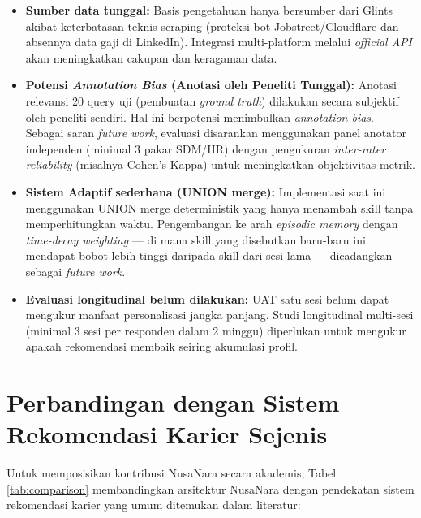 \begin{itemize}
  \item \textbf{Sumber data tunggal:} Basis pengetahuan hanya bersumber dari Glints
    akibat keterbatasan teknis scraping (proteksi bot Jobstreet/Cloudflare dan
    absennya data gaji di LinkedIn). Integrasi multi-platform melalui
    \textit{official API} akan meningkatkan cakupan dan keragaman data.
  \item \textbf{Potensi \textit{Annotation Bias} (Anotasi oleh Peneliti Tunggal):}
    Anotasi relevansi 20 query uji (pembuatan \textit{ground truth}) dilakukan secara
    subjektif oleh peneliti sendiri. Hal ini berpotensi menimbulkan \textit{annotation bias}.
    Sebagai saran \textit{future work}, evaluasi disarankan menggunakan panel anotator
    independen (minimal 3 pakar SDM/HR) dengan pengukuran \textit{inter-rater
    reliability} (misalnya Cohen's Kappa) untuk meningkatkan objektivitas metrik.
  \item \textbf{Sistem Adaptif sederhana (UNION merge):} Implementasi saat ini
    menggunakan UNION merge deterministik yang hanya menambah skill tanpa
    memperhitungkan waktu. Pengembangan ke arah \textit{episodic memory} dengan
    \textit{time-decay weighting} --- di mana skill yang disebutkan baru-baru ini
    mendapat bobot lebih tinggi daripada skill dari sesi lama --- dicadangkan
    sebagai \textit{future work}.
  \item \textbf{Evaluasi longitudinal belum dilakukan:} UAT satu sesi belum dapat
    mengukur manfaat personalisasi jangka panjang. Studi longitudinal multi-sesi
    (minimal 3 sesi per responden dalam 2 minggu) diperlukan untuk mengukur
    apakah rekomendasi membaik seiring akumulasi profil.
\end{itemize}

\section{Perbandingan dengan Sistem Rekomendasi Karier Sejenis}
\label{sec:comparison}

Untuk memposisikan kontribusi NusaNara secara akademis, Tabel \ref{tab:comparison}
membandingkan arsitektur NusaNara dengan pendekatan sistem rekomendasi karier
yang umum ditemukan dalam literatur:

